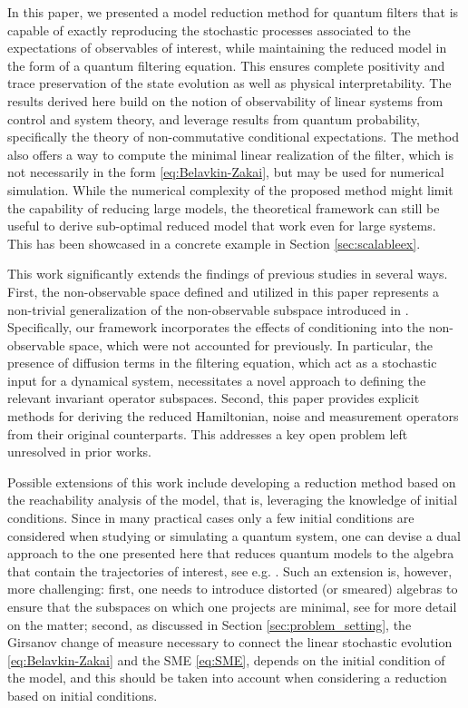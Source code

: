 \documentclass[aihp,12pt]{imsart}
\theoremstyle{theorem}
\theoremstyle{definition}
\theoremstyle{remark}
\begin{document}
In this paper, we presented a model reduction method for quantum filters that is capable of exactly reproducing the stochastic processes associated to the expectations of observables of interest, while maintaining the reduced model in the form of a quantum filtering equation. This ensures complete positivity and trace preservation of the state evolution as well as physical interpretability. The results derived here build on the notion of observability of linear systems from control and system theory, and leverage results from quantum probability, specifically the theory of non-commutative conditional expectations. The method also offers a way to compute the minimal linear realization of the filter, which is not necessarily in the form \eqref{eq:Belavkin-Zakai}, but may be used for numerical simulation.
While the numerical complexity of the proposed method might limit the capability of reducing large models, the theoretical framework can still be useful to derive sub-optimal reduced model that work even for large systems. This has been showcased in a concrete example in Section \ref{sec:scalableex}.

This work significantly extends the findings of previous studies \cite{tit2023,prxq2024,letter2024} in several ways. First, the non-observable space defined and utilized in this paper represents a non-trivial generalization of the non-observable subspace introduced in \cite{prxq2024}. Specifically, our framework incorporates the effects of conditioning into the non-observable space, which were not accounted for previously. In particular, the presence of diffusion terms in the filtering equation, which act as a stochastic input for a dynamical system, necessitates a novel approach to defining the relevant invariant operator subspaces.
Second, this paper provides explicit methods for deriving the reduced Hamiltonian, noise and measurement operators from their original counterparts. This addresses a key open problem left unresolved in prior works.

Possible extensions of this work include developing a reduction method based on the reachability analysis of the model, that is, leveraging the knowledge of initial conditions. Since in many practical cases only a few initial conditions are considered when studying or simulating a quantum system, one can devise a dual approach to the one presented here that reduces quantum models to the algebra that contain the trajectories of interest, see e.g. \cite{prxq2024,tit2023}. Such an extension is, however, more challenging: first, one needs to introduce distorted (or smeared) algebras to ensure that the subspaces on which one projects are minimal, see \cite{tit2023} for more detail on the matter; second, as discussed in Section \ref{sec:problem_setting}, the Girsanov change of measure necessary to connect the linear stochastic evolution \eqref{eq:Belavkin-Zakai} and the SME \eqref{eq:SME}, depends on the initial condition of the model, and this should be taken into account when considering a reduction based on initial conditions. 
\end{document}
